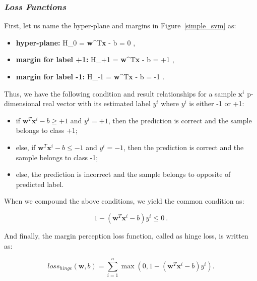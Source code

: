 \subsubsection*{\textit{Loss Functions}}

First, let us name the hyper-plane and margins in Figure~\ref{simple_svm} as:

\begin{itemize}
    \item \textbf{hyper-plane:} 
    \be \label{h0_formula} H_{0} = \textbf{w}^{T}\textbf{x} - b = 0 \:,\ee
    \item \textbf{margin for label +1:}
    \be \label{h+1_formula} H_{+1} = \textbf{w}^{T}\textbf{x} - b = +1 \:,\:\ee
    \item \textbf{margin for label -1:}
    \be \label{h-1_formula} H_{-1} = \textbf{w}^{T}\textbf{x} - b = -1 \:.\ee
\end{itemize}

Thus, we have the following condition and result relationships for a sample $\textbf{x}^{i}$ p-dimensional real vector with its estimated label $y^{i}$ where $y^{i}$ is either -1 or +1:

\begin{itemize}
    \item if $\textbf{w}^{T}\textbf{x}^{i} - b \geq +1$ and $y^{i} = +1$, then the prediction is correct and the sample belongs to class +1;
    \item else, if $\textbf{w}^{T}\textbf{x}^{i} - b \leq -1$ and $y^{i} = -1$, then the prediction is correct and the sample belongs to class -1;
    \item else, the prediction is incorrect and the sample belongs to opposite of predicted label.
\end{itemize}

When we compound the above conditions, we yield the common condition as:

\begin{equation}
\label{common_loss} 
1 - (\textbf{w}^{T}\textbf{x}^{i} - b)y^{i} \leq 0\:.
\end{equation}

And finally, the margin perception loss function, called as hinge loss, is written as:

\begin{equation}
\label{hinge_loss} 
loss_{hinge}(\textbf{w}, b) = \sum_{i=1}^{n} \max(0, 1 - (\textbf{w}^{T}\textbf{x}^{i} - b)y^{i}).
\end{equation}


